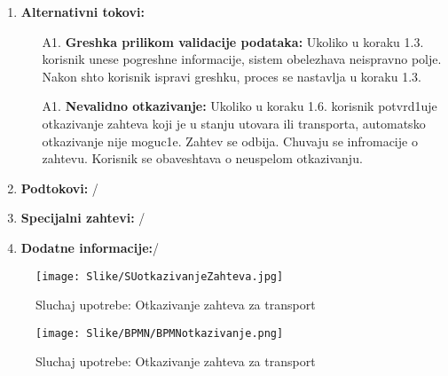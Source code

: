 \begin{enumerate}
\begin{enumerate}
        \end{enumerate}
    \item \textbf{Alternativni tokovi:}
            \begin{enumerate}
                \item [A1.] \textbf{Greshka prilikom validacije podataka: }
                Ukoliko u koraku 1.3. korisnik unese pogreshne informacije, sistem obelezhava neispravno polje. 
                Nakon shto korisnik ispravi greshku, proces se nastavlja u koraku 1.3.
                
                \item [A1.] \textbf{Nevalidno otkazivanje: }
                Ukoliko u koraku 1.6. korisnik potvrd1uje otkazivanje zahteva koji je u stanju utovara ili transporta, automatsko otkazivanje nije moguc1e. Zahtev se odbija. Chuvaju se infromacije o zahtevu. Korisnik se obaveshtava o neuspelom otkazivanju.
            \end{enumerate}
        
    \item \textbf{Podtokovi:} /
    \item \textbf{Specijalni zahtevi:} /
    \item \textbf{Dodatne informacije:}/
    
\end{enumerate}



\begin{figure}[h!]
    \texttt{[image: Slike/SUotkazivanjeZahteva.jpg]}
    \centering
    \caption{Sluchaj upotrebe: Otkazivanje zahteva za transport}
    \label{dsuponistavanje}
\end{figure}    


\newpage

\begin{figure}[h!]
    \texttt{[image: Slike/BPMN/BPMNotkazivanje.png]}
    \centering
    \caption{Sluchaj upotrebe: Otkazivanje zahteva za transport}
    \label{bpmnponistavanje}
\end{figure}    




